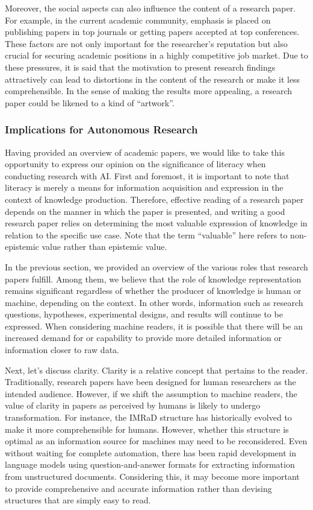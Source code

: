 \documentclass{book}
\begin{document}
Moreover, the social aspects can also influence the content of a research paper. For example, in the current academic community, emphasis is placed on publishing papers in top journals or getting papers accepted at top conferences. These factors are not only important for the researcher's reputation but also crucial for securing academic positions in a highly competitive job market. Due to these pressures, it is said that the motivation to present research findings attractively can lead to distortions in the content of the research or make it less comprehensible. In the sense of making the results more appealing, a research paper could be likened to a kind of ``artwork''.

\subsubsection{Implications for Autonomous Research}
Having provided an overview of academic papers, we would like to take this opportunity to express our opinion on the significance of literacy when conducting research with AI. First and foremost, it is important to note that literacy is merely a means for information acquisition and expression in the context of knowledge production. Therefore, effective reading of a research paper depends on the manner in which the paper is presented, and writing a good research paper relies on determining the most valuable expression of knowledge in relation to the specific use case. Note that the term ``valuable'' here refers to non-epistemic value rather than epistemic value.

In the previous section, we provided an overview of the various roles that research papers fulfill. Among them, we believe that the role of knowledge representation remains significant regardless of whether the producer of knowledge is human or machine, depending on the context. In other words, information such as research questions, hypotheses, experimental designs, and results will continue to be expressed. When considering machine readers, it is possible that there will be an increased demand for or capability to provide more detailed information or information closer to raw data.

Next, let's discuss clarity. Clarity is a relative concept that pertains to the reader. Traditionally, research papers have been designed for human researchers as the intended audience. However, if we shift the assumption to machine readers, the value of clarity in papers as perceived by humans is likely to undergo transformation. For instance, the IMRaD structure has historically evolved to make it more comprehensible for humans. However, whether this structure is optimal as an information source for machines may need to be reconsidered. Even without waiting for complete automation, there has been rapid development in language models using question-and-answer formats for extracting information from unstructured documents. Considering this, it may become more important to provide comprehensive and accurate information rather than devising structures that are simply easy to read.
\end{document}
